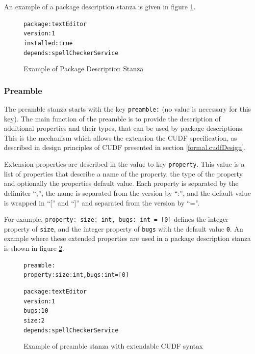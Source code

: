 An example of a package description stanza is given in figure \ref{formal.cudfpdstanza}.
\begin{figure}[htp] 
\begin{center}
\begin{alltt}
package: textEditor
version: 1
installed: true
depends: spellCheckerService
\end{alltt}
  \caption{Example of Package Description Stanza}
  \label{formal.cudfpdstanza}
\end{center}
\end{figure}

\subsubsection{Preamble}
\label{cudf.preambledes}
The preamble stanza starts with the key \verb+preamble:+ (no value is necessary for this key).
The main function of the preamble is to provide the description of additional properties and their types, that can be used by package descriptions.
This is the mechanism which allows the extension the CUDF specification, as described in design principles of CUDF presented in section \ref{formal.cudfDesign}.

Extension properties are described in the value to key \verb+property+.
This value is a list of properties that describe a name of the property, the type of the property and optionally the properties default value.
Each property is separated by the delimiter ``,'', the name is separated from the version by ``:'', and the default value is wrapped in ``['' and ``]'' and separated from the version by ``=''.

For example, \verb+property: size: int, bugs: int = [0]+ defines the integer property of \verb+size+, and the integer property of \verb+bugs+ with the default value \verb+0+.
An example where these extended properties are used in a package description stanza is shown in figure \ref{formal.cudfextensionexample}.

\begin{figure}[htp] 
\begin{center}
\begin{alltt}
preamble:
property: size: int, bugs: int = [0]

package: textEditor
version: 1
bugs: 10
size: 2
depends: spellCheckerService

\end{alltt}
  \caption{Example of preamble stanza with extendable CUDF syntax}
  \label{formal.cudfextensionexample}
\end{center}
\end{figure}

